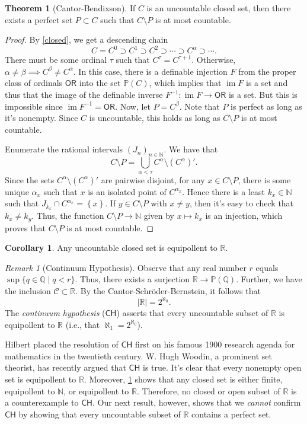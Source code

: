 \documentclass[10pt,letterpaper,cm]{nupset}
\theoremstyle{definition}
\theoremstyle{theorem}
\newtheorem{theorem}[definition]{Theorem}
\newtheorem{corollary}[definition]{Corollary}
\theoremstyle{remark}
\newtheorem{remark}[definition]{Remark}
\newcommand{\N}{\mathbb N}
\renewcommand{\P}{\mathbb P}
\newcommand{\Q}{\mathbb Q}
\newcommand{\R}{\mathbb R}
\newcommand{\1}{\mathbf{1}}
\newcommand{\0}{\vec 0}
\newcommand{\ord}{\mathsf{OR}}
\DeclareMathOperator{\im}{im}
\begin{document}
\begin{theorem}[Cantor-Bendixson]
If $C$ is an uncountable closed set, then there exists a perfect set $P\subset C$ such that $C \setminus P$ is at most countable.
\end{theorem}
\begin{proof}
By \cref{closed}, we get a descending chain $$ C = C^0 \supset C^1 \supset C^2 \supset \cdots \supset C^{\alpha} \supset \cdots.    $$ There must be some ordinal $\tau$ such that $C^{\tau} = C^{\tau +1}$. Otherwise, $\alpha \ne \beta \implies C^{\beta} \ne C^{\alpha}$. In this case, there is a definable injection $F$ from the proper class of ordinals $\ord$ into the set $\P(C)$, which implies that $\im{F}$ is a set and thus that the image of the definable inverse $F^{-1} : \im{F} \to \ord$ is a set. But this is impossible since $\im{F^{-1}} = \ord$. Now, let $P = C^{\beta}$. Note that $P$ is perfect as long as it's nonempty. Since $C$ is uncountable, this holds as long as  $C \setminus P$ is at most countable.

\smallskip
 Enumerate the rational intervals $\left(J_n\right)_{n\in \N}$. We have that $$ C\setminus P = {\bigcup_{\alpha < \tau} C^{\alpha} \setminus \left(C^{\alpha}\right)'}.    $$ Since the sets $C^{\alpha} \setminus \left(C^{\alpha}\right)'$ are pairwise disjoint, for any $x\in C\setminus P$, there is some unique $\alpha_x$ such that $x$ is an isolated point of $C^{\alpha_x}$. Hence there is a least $k_x \in \N$ such that $J_{k_x} \cap C^{\alpha_x} = \left\{x\right\}$. If $y \in C \setminus P$ with $x\ne y$, then it's easy to check that $k_x \ne k_y$. Thus, the function $C\setminus P \to \N$ given by $x \mapsto k_x$ is an injection, which proves that $C\setminus P$ is at most countable. 
\end{proof}

\begin{corollary}\label{LC'}
Any uncountable closed set is equipollent to $\R$.
\end{corollary}

\begin{remark}[Continuum Hypothesis] 
Observe that any real number $r$ equals $\sup\{q\in \Q \mid q<r\}$. Thus, there exists a surjection $\R \to \P(\Q)$. Further, we have the inclusion $\bm{\mathcal{C}} \subset \R$. By the Cantor-Schr\"oder-Bernstein, it follows that $$\left\lvert{\R}\right\rvert =2^{\aleph_0}.$$ The \textit{continuum hypothesis} ($\mathsf{CH}$) asserts that every uncountable subset of $\R$ is equipollent to $\R$ (i.e., that   $\aleph_1 =2^{\aleph_0}$).

Hilbert placed the resolution of $\mathsf{CH}$ first on his famous 1900 research agenda for mathematics in the twentieth century. W. Hugh Woodin, a prominent set theorist, has recently argued that $\mathsf{CH}$ is true. It's clear that every nonempty open set is equipollent to $\R$. Moreover, \cref{LC'} shows that any closed set is either finite, equipollent to $\N$, or equipollent to $\R$. Therefore, no closed or open subset of $\R$ is a counterexample to $\mathsf{CH}$. Our next result, however, shows that we \emph{cannot} confirm $\mathsf{CH}$ by showing that every uncountable subset of $\R$ contains a perfect set.
\end{remark}
\end{document}
